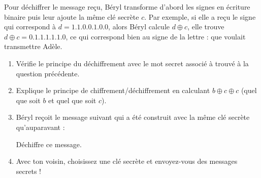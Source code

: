 \documentclass[class=report,crop=false, 12pt]{standalone}
\begin{document}
\begin{activite}
\begin{enumerate}
Pour déchiffrer le message reçu, Béryl transforme d'abord les signes en écriture binaire puis leur ajoute la même clé secrète $c$. Par exemple, si elle a reçu le signe
qui correspond à $d = 1.1.0.0.1.0.0$, alors Béryl calcule $d \oplus c$, elle trouve $d \oplus c = 0.1.1.1.1.1.0$, ce qui correspond bien au signe de la lettre  :
que voulait transmettre Adèle.

  \begin{enumerate}
    \item Vérifie le principe du déchiffrement avec le mot secret associé à  trouvé à la question précédente.
    
    \item Explique le principe de chiffrement/déchiffrement en calculant 
    $b \oplus c \oplus c$ (quel que soit $b$ et quel que soit $c$).
        
    \item Béryl reçoit le message suivant qui a été construit avec la même clé secrète qu'auparavant :
    

    
     Déchiffre ce message.
     
    \item Avec ton voisin, choisissez une clé secrète et envoyez-vous des messages secrets !
  \end{enumerate} 

\end{enumerate}

\end{activite}
\end{document}

